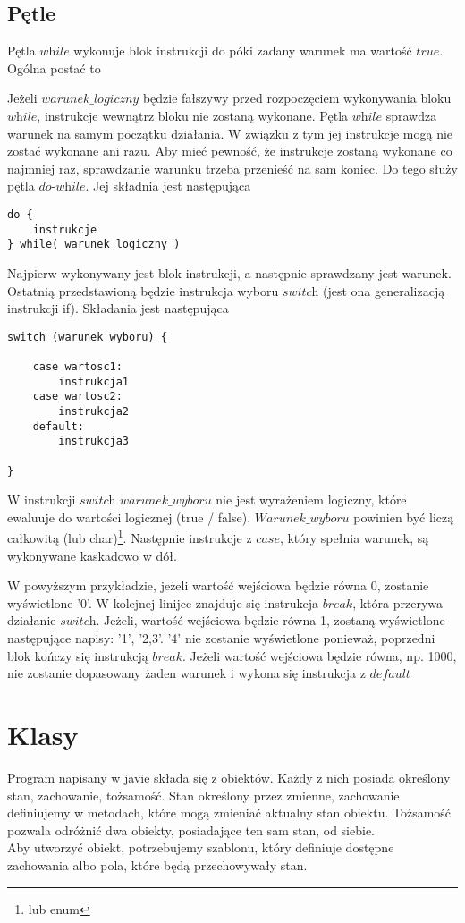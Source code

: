 \documentclass[11pt]{article}
\begin{document}
\subsection{Pętle}
Pętla $\textit{while}$ wykonuje blok instrukcji do póki zadany warunek ma wartość $\textit{true}$. Ogólna postać to
 
Jeżeli $\textit{warunek\_logiczny}$ będzie fałszywy przed rozpoczęciem wykonywania bloku $\textit{while}$, instrukcje wewnątrz bloku nie zostaną wykonane. Pętla $\textit{while}$ sprawdza warunek na samym początku działania. W związku z tym jej instrukcje mogą nie zostać wykonane ani razu. Aby mieć pewność, że instrukcje zostaną wykonane co najmniej raz, sprawdzanie warunku trzeba przenieść na sam koniec. Do tego służy pętla $\textit{do-while}$. Jej składnia jest następująca
\begin{lstlisting}
do { 
	instrukcje
} while( warunek_logiczny )
\end{lstlisting}
Najpierw wykonywany jest blok instrukcji, a następnie sprawdzany jest warunek.\\
Ostatnią przedstawioną będzie instrukcja wyboru $\textit{switch}$ (jest ona generalizacją instrukcji if). Składania jest następująca
\begin{lstlisting}
switch (warunek_wyboru) {

	case wartosc1:
		instrukcja1
	case wartosc2:
		instrukcja2
	default:
		instrukcja3

}
\end{lstlisting}
W instrukcji $\textit{switch}$ $\textit{warunek\_wyboru}$ nie jest wyrażeniem logiczny, które ewaluuje do wartości logicznej (true / false). $\textit{Warunek\_wyboru}$ powinien być liczą całkowitą (lub char)\footnote{lub enum}. Następnie instrukcje z $\textit{case}$, który spełnia warunek, są wykonywane kaskadowo w dół.

W powyższym przykładzie, jeżeli wartość wejściowa będzie równa 0, zostanie wyświetlone '0'. W kolejnej linijce znajduje się instrukcja $\textit{break}$, która przerywa działanie $\textit{switch}$.
Jeżeli, wartość wejściowa będzie równa 1, zostaną wyświetlone następujące napisy: '1', '2,3'. '4' nie zostanie wyświetlone ponieważ, poprzedni blok kończy się instrukcją $break$. Jeżeli wartość wejściowa będzie równa, np. 1000, nie zostanie dopasowany żaden warunek i wykona się instrukcja z $\textit{default}$

\section{Klasy}
Program napisany w javie składa się z obiektów. Każdy z nich posiada określony stan, zachowanie, tożsamość. Stan określony przez zmienne, zachowanie definiujemy w metodach, które mogą zmieniać aktualny stan obiektu. Tożsamość pozwala odróżnić dwa obiekty, posiadające ten sam stan, od siebie. \\
Aby utworzyć obiekt, potrzebujemy szablonu, który definiuje dostępne zachowania albo pola, które będą przechowywały stan.\\
  
\end{document}
